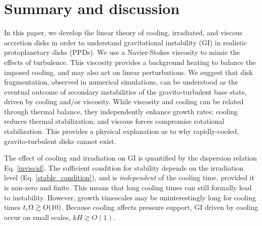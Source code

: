\section{Summary and discussion}\label{summary}
In this paper, we develop the linear theory of cooling, irradiated,
and viscous accretion disks in order to understand gravitational
instability (GI) in realistic protoplanetary disks (PPDs). 
We use a Navier-Stokes viscosity to mimic the effects of turbulence. 
This viscosity provides a background heating to balance the imposed cooling,  
and may also act on linear perturbations. %
We suggest that disk fragmentation, observed in numerical simulations, 
can be understood as the eventual outcome of secondary
instabilities of the gravito-turbulent base state, driven by cooling
and/or viscosity.     
While viscosity and cooling can be related through thermal
balance, they independently enhance growth rates: cooling reduces
thermal stabilization; and viscous forces compromise rotational
stabilization. This provides a physical explanation as to why
rapidly-cooled, gravito-turbulent disks cannot exist. 


The effect of cooling and irradiation on GI is quantified by the 
dispersion relation 
Eq. \ref{inviscid}. The sufficient condition for stability 
depends on the irradiation level (Eq. \ref{stable_condition}), and is 
\emph{independent} of the cooling time, provided it is non-zero and
finite. This means that long cooling times can still  
formally lead to instability. However, growth timescales may be 
uninterestingly long for cooling times $t_\mathrm{c}\Omega\gtrsim 
O(10)$. Because cooling affects pressure support, GI driven by cooling
occur on small scales, $kH\gtrsim O(1)$.   



